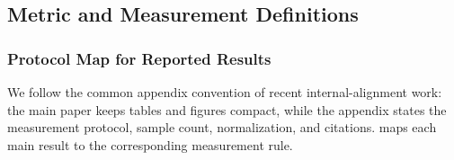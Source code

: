 \subsection{Metric and Measurement Definitions}
\label{app:metric_definitions}

\subsubsection{Protocol Map for Reported Results}

We follow the common appendix convention of recent internal-alignment work: the main paper keeps tables and figures compact, while the appendix states the measurement protocol, sample count, normalization, and citations.  maps each main result to the corresponding measurement rule.

